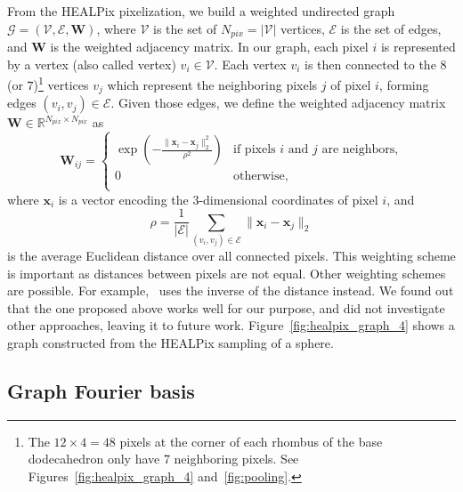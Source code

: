 \documentclass[final,twocolumn,3p,times,sort&compress]{elsarticle}
\newcommand{\figref}[1]{Figure~\ref{fig:#1}}
\renewcommand{\b}[1]{{\bm{#1}}}   %
\newcommand{\1}{\b{1}}              %
\newcommand{\0}{\b{0}}              %
\newcommand{\G}{\mathcal{G}}
\newcommand{\V}{\mathcal{V}}
\newcommand{\E}{\mathcal{E}}
\newcommand{\W}{\b{W}}
\newcommand{\x}{\b{x}}
\newcommand{\R}{\mathbb{R}}
\begin{document}
From the HEALPix pixelization, we build a weighted undirected graph $\G = (\V, \E, \W)$, where $\V$ is the set of $N_{pix} = |\V|$ vertices, $\E$ is the set of edges, and $\W$ is the weighted adjacency matrix.
In our graph, each pixel $i$ is represented by a vertex (also called vertex) $v_i \in \V$.
Each vertex $v_i$ is then connected to the $8$ (or $7$)\footnote{\label{neighbors}The $12 \times 4 = 48$ pixels at the corner of each rhombus of the base dodecahedron only have 7 neighboring pixels. See Figures~\ref{fig:healpix_graph_4} and~\ref{fig:pooling}.} vertices $v_j$ which represent the neighboring pixels $j$ of pixel $i$, forming edges $(v_i, v_j) \in \E$. Given those edges, we define the weighted adjacency matrix $\W \in \R^{N_{pix} \times N_{pix}}$ as
\begin{equation*}
	\W_{ij} = \begin{cases}
		\exp \left( -\frac{\|\x_i-\x_j\|_2^2}{\rho^2} \right) & \text{if pixels $i$ and $j$ are neighbors,} \\
		0 & \text{otherwise,} \\
	\end{cases}
\end{equation*}
where $\x_i$ is a vector encoding the 3-dimensional coordinates of pixel $i$, and
\begin{equation*}
	\rho = \frac{1}{|\E|} \sum_{(v_i, v_j) \in \E} \|\x_i-\x_j\|_2
\end{equation*}
is the average Euclidean distance over all connected pixels. This weighting scheme is important as distances between pixels are not equal.
Other weighting schemes are possible. For example,~\cite{khasanova2017graphomni} uses the inverse of the distance instead. We found out that the one proposed above works well for our purpose, and did not investigate other approaches, leaving it to future work.
\figref{healpix_graph_4} shows a graph constructed from the HEALPix sampling of a sphere.


\subsection{Graph Fourier basis}
\end{document}
